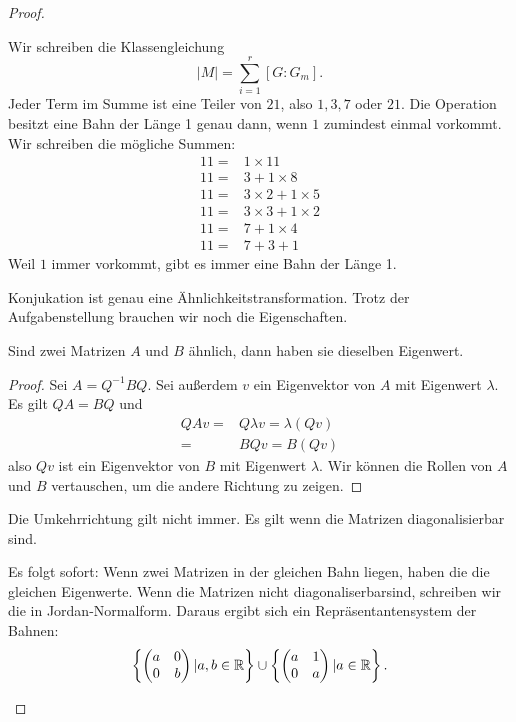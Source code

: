 \begin{proof}
	\begin{parts}
	\item Wir schreiben die Klassengleichung
		\[
			|M|=\sum_{i=1}^r [G:G_m]
		.\] 
		Jeder Term im Summe ist eine Teiler von $21$, also $1,3,7$ oder $21$. Die Operation besitzt eine Bahn der Länge 1 genau dann, wenn $1$ zumindest einmal vorkommt. Wir schreiben die mögliche Summen:
	\begin{align*}
		11=&1\times 11\\
		11=&3+1\times 8\\
		11=&3\times 2+1\times 5\\
		11=&3\times 3+1\times 2\\
		11=&7+1\times 4\\
		11=&7+3+1
	\end{align*} 
	Weil $1$ immer vorkommt, gibt es immer eine Bahn der Länge 1.
	\item Konjukation ist genau eine Ähnlichkeitstransformation. Trotz der Aufgabenstellung brauchen wir noch die Eigenschaften.
		\begin{tcolorbox}
			\begin{Lemma}
			Sind zwei Matrizen $A$ und $B$ ähnlich, dann haben sie dieselben Eigenwert.	
			\end{Lemma}
			\begin{proof}
			Sei $A=Q^{-1}BQ$. Sei außerdem $v$ ein Eigenvektor von $A$ mit Eigenwert $\lambda$. Es gilt $QA=BQ$ und
		\begin{align*}
			QAv=&Q\lambda v=\lambda(Qv)\\
			=&BQv=B(Qv)
		\end{align*}
		also $Qv$ ist ein Eigenvektor von $B$ mit Eigenwert $\lambda$. Wir können die Rollen von $A$ und $B$ vertauschen, um die andere Richtung zu zeigen. 	
			\end{proof}
			\begin{Remark}
				Die Umkehrrichtung gilt nicht immer. Es gilt wenn die Matrizen diagonalisierbar sind.
			\end{Remark}
		\end{tcolorbox}
		Es folgt sofort: Wenn zwei Matrizen in der gleichen Bahn liegen, haben die die gleichen Eigenwerte. Wenn die Matrizen nicht diagonaliserbarsind, schreiben wir die in Jordan-Normalform. Daraus ergibt sich ein Repräsentantensystem der Bahnen:
		\[
			\left\{ \begin{pmatrix} a & 0 \\ 0 & b \end{pmatrix} |a,b\in \mathbb{R} \right\} \cup \left\{ \begin{pmatrix} a & 1 \\ 0 & a \end{pmatrix} |a\in \mathbb{R} \right\} 
		.\] 
	\end{parts}
\end{proof}

